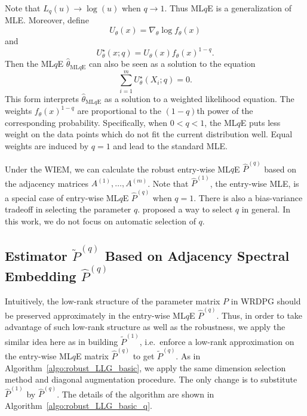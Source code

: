 Note that $L_q(u) \to \log(u)$ when $q \to 1$. Thus ML$q$E is a generalization of MLE.
Moreover, define
\[
	U_{\theta}(x) = \nabla_{\theta} \log f_{\theta}(x)
\]
and
\[
	U^{\star}_{\theta}(x; q) = U_{\theta}(x) f_{\theta}(x)^{1-q}.
\]
Then the ML$q$E $\hat{\theta}_{\mathrm{ML}q\mathrm{E}}$ can also be seen as a solution to the equation
\[
	\sum_{i=1}^m U^{\star}_{\theta}(X_i; q) = 0.
\]
This form interprets $\hat{\theta}_{\mathrm{ML}q\mathrm{E}}$ as a solution to a weighted likelihood equation. The weights $f_{\theta}(x)^{1-q}$ are proportional to the $(1-q)$th power of the corresponding probability. Specifically, when $0 < q < 1$, the ML$q$E puts less weight on the data points which do not fit the current distribution well. Equal weights are induced by $q=1$ and lead to the standard MLE.

Under the WIEM, we can calculate the robust entry-wise ML$q$E $\hat{P}^{(q)}$ based on the adjacency matrices $A^{(1)}, \dotsc, A^{(m)}$. Note that $\hat{P}^{(1)}$, the entry-wise MLE, is a special case of entry-wise ML$q$E $\hat{P}^{(q)}$ when $q = 1$. 
There is also a bias-variance tradeoff in selecting the parameter $q$. \citet{qin2017robust} proposed a way to select $q$ in general. In this work, we do not focus on automatic selection of $q$.



\subsection{Estimator $\widetilde{P}^{(q)}$ Based on Adjacency Spectral Embedding $\hat{P}^{(q)}$}

Intuitively, the low-rank structure of the parameter matrix $P$ in WRDPG should be preserved approximately in the entry-wise ML$q$E $\hat{P}^{(q)}$. Thus, in order to take advantage of such low-rank structure as well as the robustness, we apply the similar idea here as in building $\widetilde{P}^{(1)}$, i.e.\ enforce a low-rank approximation on the entry-wise ML$q$E matrix $\hat{P}^{(q)}$ to get $\widetilde{P}^{(q)}$. As in Algorithm~\ref{algo:robust_LLG_basic}, we apply the same dimension selection method and diagonal augmentation procedure.
The only change is to substitute $\hat{P}^{(1)}$ by $\hat{P}^{(q)}$. The details of the algorithm are shown in Algorithm~\ref{algo:robust_LLG_basic_q}.

